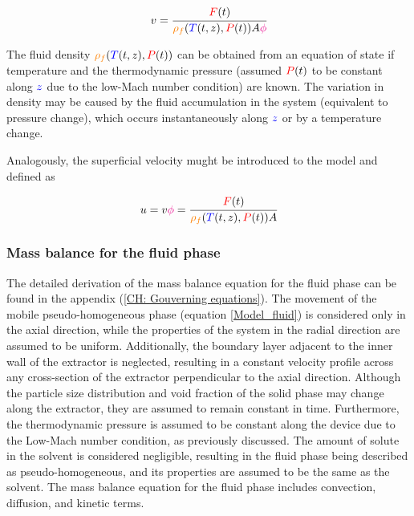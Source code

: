 \documentclass[../Article_Model_Parameters.tex]{subfiles}
\begin{document}
	{\footnotesize
	\begin{equation}
		v = \cfrac{{\color{red}F}(t)}{{\color{orange}\rho_f}({\color{blue}T}(t,z),{\color{red}P}(t)) A {\color{magenta}\phi}} 
	\end{equation}
	}
	
	The fluid density ${\color{orange}\rho_f}({\color{blue}T}(t,z),{\color{red}P}(t))$ can be obtained from an equation of state if temperature and the thermodynamic pressure (assumed ${\color{red}P}(t)$ to be constant along ${\color{blue}z}$ due to the low-Mach number condition) are known. The variation in density may be caused by the fluid accumulation in the system (equivalent to pressure change), which occurs instantaneously along ${\color{blue}z}$ or by a temperature change. 
	
	Analogously, the superficial velocity mught be introduced to the model and defined as
	
	{\footnotesize
		\begin{equation}
			u = v {\color{magenta}\phi} = \cfrac{{\color{red}F}(t)}{{\color{orange}\rho_f}({\color{blue}T}(t,z),{\color{red}P}(t)) A }
		\end{equation}
	}
	
	\subsubsection{Mass balance for the fluid phase} \label{CH: Mass_balance_fluid}
	
	The detailed derivation of the mass balance equation for the fluid phase can be found in the appendix (\ref{CH: Gouverning equations}). The movement of the mobile pseudo-homogeneous phase (equation \ref{Model_fluid}) is considered only in the axial direction, while the properties of the system in the radial direction are assumed to be uniform. Additionally, the boundary layer adjacent to the inner wall of the extractor is neglected, resulting in a constant velocity profile across any cross-section of the extractor perpendicular to the axial direction. Although the particle size distribution and void fraction of the solid phase may change along the extractor, they are assumed to remain constant in time. Furthermore, the thermodynamic pressure is assumed to be constant along the device due to the Low-Mach number condition, as previously discussed. The amount of solute in the solvent is considered negligible, resulting in the fluid phase being described as pseudo-homogeneous, and its properties are assumed to be the same as the solvent. The mass balance equation for the fluid phase includes convection, diffusion, and kinetic terms.
	
\end{document}
